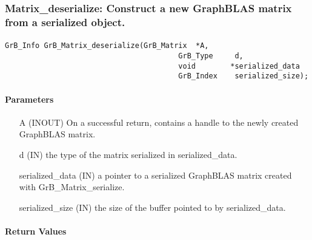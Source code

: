 \subsubsection{{\sf Matrix\_deserialize}: Construct a new GraphBLAS matrix from a serialized object. }
\label{Sec:Matrix_deserialize}

\paragraph{\syntax}

\begin{Verbatim}[samepage=true]
        GrB_Info GrB_Matrix_deserialize(GrB_Matrix  *A,
                                        GrB_Type     d,
                                        void        *serialized_data
                                        GrB_Index    serialized_size);
\end{Verbatim}

\paragraph{Parameters}

\begin{itemize}[leftmargin=1.1in]
    \item[{\sf A}]      ({\sf INOUT}) On a successful return, contains a handle to the newly created GraphBLAS matrix.
    \item[{\sf d}]      ({\sf IN}) the type of the matrix serialized in {\sf serialized\_data}.
    \item[{\sf serialized\_data}] ({\sf IN}) a pointer to a serialized GraphBLAS matrix created with {\sf GrB\_Matrix\_serialize}.
    \item[{\sf serialized\_size}]  ({\sf IN}) the size of the buffer pointed to by {\sf serialized\_data}.
\end{itemize}
\paragraph{Return Values}

